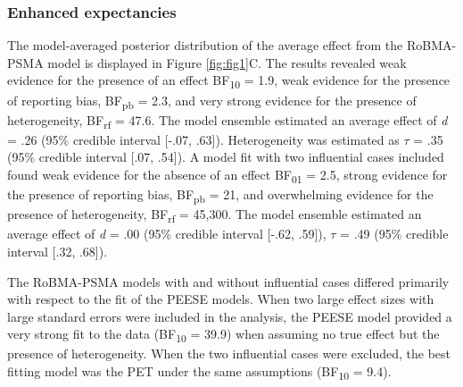 \documentclass[
  doc, donotrepeattitle,floatsintext]{apa7}
\begin{document}
\hypertarget{enhanced-expectancies}{%
\subsubsection{Enhanced expectancies}\label{enhanced-expectancies}}

The model-averaged posterior distribution of the average effect from the RoBMA-PSMA model is displayed in Figure \ref{fig:fig1}C. The results revealed weak evidence for the presence of an effect BF\textsubscript{10} = 1.9, weak evidence for the presence of reporting bias, BF\textsubscript{pb} = 2.3, and very strong evidence for the presence of heterogeneity, BF\textsubscript{rf} = 47.6. The model ensemble estimated an average effect of \emph{d} = .26 (95\% credible interval {[}-.07, .63{]}). Heterogeneity was estimated as \(\tau\) = .35 (95\% credible interval {[}.07, .54{]}). A model fit with two influential cases included found weak evidence for the absence of an effect BF\textsubscript{01} = 2.5, strong evidence for the presence of reporting bias, BF\textsubscript{pb} = 21, and overwhelming evidence for the presence of heterogeneity, BF\textsubscript{rf} = 45,300. The model ensemble estimated an average effect of \emph{d} = .00 (95\% credible interval {[}-.62, .59{]}), \(\tau\) = .49 (95\% credible interval {[}.32, .68{]}).

The RoBMA-PSMA models with and without influential cases differed primarily with respect to the fit of the PEESE models. When two large effect sizes with large standard errors were included in the analysis, the PEESE model provided a very strong fit to the data (BF\textsubscript{10} = 39.9) when assuming no true effect but the presence of heterogeneity. When the two influential cases were excluded, the best fitting model was the PET under the same assumptions (BF\textsubscript{10} = 9.4).

\clearpage
\end{document}
